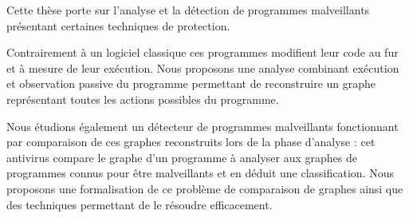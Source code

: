 Cette thèse porte sur l'analyse et la détection de programmes malveillants présentant certaines techniques de protection.

Contrairement à un logiciel classique ces programmes modifient leur code au fur et à mesure de leur exécution.
Nous proposons une analyse combinant exécution et observation passive du programme permettant de reconstruire un graphe représentant toutes les actions possibles du programme.

Nous étudions également un détecteur de programmes malveillants fonctionnant par comparaison de ces graphes reconstruits lors de la phase d'analyse : cet antivirus compare le graphe d'un programme à analyser aux graphes de programmes connus pour être malveillants et en déduit une classification.
Nous proposons une formalisation de ce problème de comparaison de graphes ainsi que des techniques permettant de le résoudre efficacement.